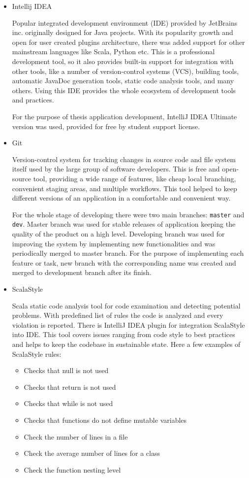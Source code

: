 \begin{itemize}
\item Intellij IDEA

Popular integrated development environment (IDE) provided by JetBrains inc. originally designed for Java projects. With its popularity growth and open for user created plugins architecture, there was added support for other mainstream languages like Scala, Python etc. This is a professional development tool, so it also provides built-in support for integration with other tools, like a number of version-control systems (VCS), building tools, automatic JavaDoc generation tools, static code analysis tools, and many others. Using this IDE provides the whole ecosystem of development tools and practices. 

For the purpose of thesis application development, IntelliJ IDEA Ultimate version was used, provided for free by student support license.
\smallskip

\item Git

Version-control system for tracking changes in source code and file system itself used by the large group of software developers. This is free and open-source tool, providing a wide range of features, like cheap local branching, convenient staging areas, and multiple workflows. This tool helped to keep different versions of an application in a comfortable and convenient way.

For the whole stage of developing there were two main branches: \texttt{master} and \texttt{dev}. Master branch was used for stable releases of application keeping the quality of the product on a high level. Developing branch was used for improving the system by implementing new functionalities and was periodically merged to master branch. For the purpose of implementing each feature or task, new branch with the corresponding name was created and merged to development branch after its finish.
\smallskip

\item ScalaStyle

Scala static code analysis tool for code examination and detecting potential problems. With predefined list of rules the code is analyzed and every violation is reported. There is IntelliJ IDEA plugin for integration ScalaStyle into IDE. This tool covers issues ranging from code style to best practices and helps to keep the codebase in sustainable state. Here a few examples of ScalaStyle rules:
\begin{itemize}
\item Checks that null is not used
\item Checks that return is not used
\item Checks that while is not used
\item Checks that functions do not define mutable variables
\item Check the number of lines in a file
\item Check the average number of lines for a class
\item Check the function nesting level
\end{itemize}


\end{itemize}

